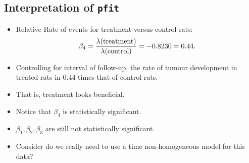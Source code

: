 \documentclass{article}\usepackage[]{graphicx}\usepackage[svgnames]{xcolor}
\let\exp\relax%
\begin{document}
\subsection*{Interpretation of \texttt{pfit}}
\begin{itemize}
    \item Relative Rate of events for treatment versus control rats:
          \[ \exp{\beta_4}=\frac{\lambda(\text{treatment})}{\lambda(\text{control})}=\exp{-0.8230}=0.44. \]
    \item Controlling for interval of follow-up, the rate of tumour development in treated rats
          in $0.44$ times that of control rats.
    \item That is, treatment looks beneficial.
    \item Notice that $ \beta_4 $ is statistically significant.
    \item $ \beta_1,\beta_2,\beta_3 $ are still not statistically significant.
    \item Consider do we really need to use a time non-homogeneous model for this data?
\end{itemize}
\end{document}
